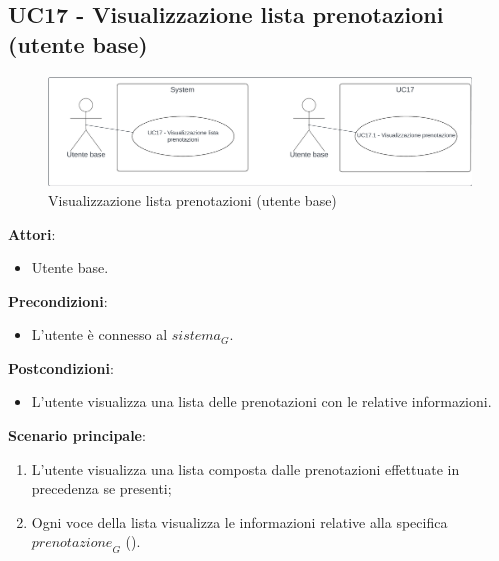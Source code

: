 \subsection{UC17 - Visualizzazione lista prenotazioni (utente base)} \label{usecase:17}
\begin{figure}[H]
  \centering
  \includegraphics[width=1\textwidth]{ucd/UCD17.png}
  \caption{Visualizzazione lista prenotazioni (utente base)}
\end{figure}
\textbf{Attori}:
\begin{itemize}
    \item Utente base.
\end{itemize}
\textbf{Precondizioni}:
\begin{itemize}
    \item L'utente è connesso al $\textit{sistema}_G$.
\end{itemize}
\textbf{Postcondizioni}:
\begin{itemize}
    \item L'utente visualizza una lista delle prenotazioni con le relative informazioni.
\end{itemize}
\textbf{Scenario principale}:
\begin{enumerate}
    \item L'utente visualizza una lista composta dalle prenotazioni effettuate in precedenza se presenti;
    \item Ogni voce della lista visualizza le informazioni relative alla specifica $\textit{prenotazione}_G$ ().
\end{enumerate}

